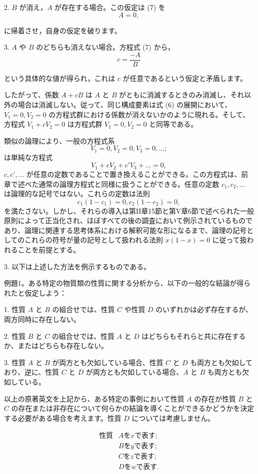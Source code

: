 \documentclass[a4paper,11pt,openany]{ltjsbook}
\begin{document}
2. $B$ が消え，$A$ が存在する場合。この仮定は (7) を
\[
A = 0,
\]

に帰着させ，自身の仮定を破ります。

3. $A$ や $B$ のどちらも消えない場合。方程式 (7) から，
\[
c = \frac{-A}{B}
\]

という具体的な値が得られ，これは $c$ が任意であるという仮定と矛盾します。

したがって、係数 $A + cB$ は $A$ と $B$ がともに消滅するときのみ消滅し、それ以外の場合は消滅しない。従って、同じ構成要素は式 (6) の展開において、$V_1 = 0, V_2 = 0$ の方程式群における係数が消えないかのように現れる。そして、方程式 $V_1 + cV_2 = 0$ は方程式群 $V_1 = 0, V_2 = 0$ と同等である。

類似の論理により、一般の方程式系
\[
V_1 = 0, V_2 = 0, V_3 = 0, \ldots;
\]
は単純な方程式
\[
V_1 + cV_2 + c'V_3 + \ldots = 0,
\]
$c, c', \ldots$ が任意の定数であることで置き換えることができる。この方程式は、前章で述べた通常の論理方程式と同様に扱うことができる。任意の定数 $c_1, c_2, \ldots$ は論理的な記号ではない。これらの定数は法則
\[
c_1 (1 - c_1) = 0, c_2 (1 - c_2) = 0,
\]
を満たさない。しかし、それらの導入は第II章15節と第V章6節で述べられた一般原則によって正当化され、ほぼすべての後の調査において例示されているものであり、論理に関連する思考体系における解釈可能な形になるまで、論理の記号としてのこれらの符号が量の記号として扱われる法則 $x (1 - x) = 0$ に従って扱われることを前提とする。

3. 以下は上述した方法を例示するものである。

例題1。ある特定の物質類の性質に関する分析から、以下の一般的な結論が得られたと仮定しよう：

1. 性質 $A$ と $B$ の組合せでは、性質 $C$ や性質 $D$ のいずれかは必ず存在するが、両方同時に存在しない。

2. 性質 $B$ と $C$ の組合せでは、性質 $A$ と $D$ はどちらもそれらと共に存在するか、またはどちらも存在しない。

3. 性質 $A$ と $B$ が両方とも欠如している場合、性質 $C$ と $D$ も両方とも欠如しており、逆に、性質 $C$ と $D$ が両方とも欠如している場合、$A$ と $B$ も両方とも欠如している。

以上の原著英文を上記から、ある特定の事例において性質 \(A\) の存在が性質 \(B\) と \(C\) の存在または非存在について何らかの結論を導くことができるかどうかを決定する必要がある場合を考えます。性質 \(D\) については考慮しません。

\[
\begin{array}{cccccc}
性質 & A を x で表す; \\
     & B を y で表す; \\
     & C を z で表す; \\
     & D を w で表す.
\end{array}
\]
\end{document}
